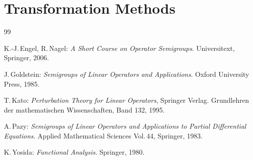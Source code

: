 \documentclass[11pt,twoside]{article}
\begin{document}
\section{Transformation Methods}

\newpage
\thispagestyle{empty}

\vspace{8mm}
\begin{thebibliography}{99}
\begin{small}

  K.-J.\,Engel, R.\,Nagel:
\textit{A Short Course on Operator Semigroups}.
Universitext, Springer, 2006.

  J.\,Goldstein:
\textit{Semigroups of Linear Operators and Applications}.
Oxford University Press, 1985.

 T.\,Kato:
\textit{Perturbation Theory for Linear Operators}, Springer Verlag.
Grundlehren der mathematischen Wissenschaften, Band 132, 1995.

  A.\,Pazy:
\textit{Semigroups of Linear Operators
        and Applications to Partial Differential Equations}.
Applied Mathematical Sciences Vol.\,44, Springer, 1983.

  K.\,Yosida:
\textit{Functional Analysis}.
Springer, 1980.

\end{small}
\end{thebibliography}
\end{document}
